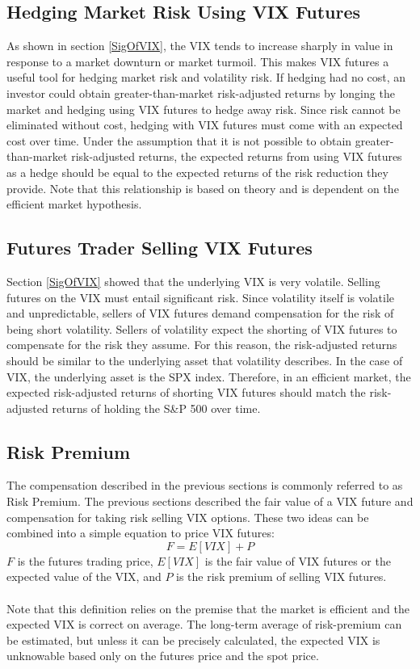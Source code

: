 \documentclass[11pt, oneside]{book}
\begin{document}
\subsection{Hedging Market Risk Using VIX Futures} \label{Futures-VIXFuts-Hedging}
As shown in section \ref{SigOfVIX}, the VIX tends to increase sharply in value in response to a market downturn or market turmoil. This makes VIX futures a useful tool for hedging market risk and volatility risk. If hedging had no cost, an investor could obtain greater-than-market risk-adjusted returns by longing the market and hedging using VIX futures to hedge away risk. Since risk cannot be eliminated without cost, hedging with VIX futures must come with an expected cost over time. Under the assumption that it is not possible to obtain greater-than-market risk-adjusted returns, the expected returns from using VIX futures as a hedge should be equal to the expected returns of the risk reduction they provide. Note that this relationship is based on theory and is dependent on the efficient market hypothesis.

\subsection{Futures Trader Selling VIX Futures} \label{Futures-VIXFuts-Selling}
Section \ref{SigOfVIX} showed that the underlying VIX is very volatile. Selling futures on the VIX must entail significant risk. Since volatility itself is volatile and unpredictable, sellers of VIX futures demand compensation for the risk of being short volatility. Sellers of volatility expect the shorting of VIX futures to compensate for the risk they assume. For this reason, the risk-adjusted returns should be similar to the underlying asset that volatility describes. In the case of VIX, the underlying asset is the SPX index. Therefore, in an efficient market, the expected risk-adjusted returns of shorting VIX futures should match the risk-adjusted returns of holding the S\&P 500 over time.

\subsection{Risk Premium} \label{Futures-VIXFuts-Premium}
The compensation described in the previous sections is commonly referred to as Risk Premium. The previous sections described the fair value of a VIX future and compensation for taking risk selling VIX options. These two ideas can be combined into a simple equation to price VIX futures:
\begin{equation}
F = E[VIX] + P
\end{equation} \label{Eq-VIXPricing}
$F$ is the futures trading price, $E[VIX]$ is the fair value of VIX futures or the expected value of the VIX, and $P$ is the risk premium of selling VIX futures.\\
\\
Note that this definition relies on the premise that the market is efficient and the expected VIX is correct on average. The long-term average of risk-premium can be estimated, but unless it can be precisely calculated, the expected VIX is unknowable based only on the futures price and the spot price.
\end{document}
